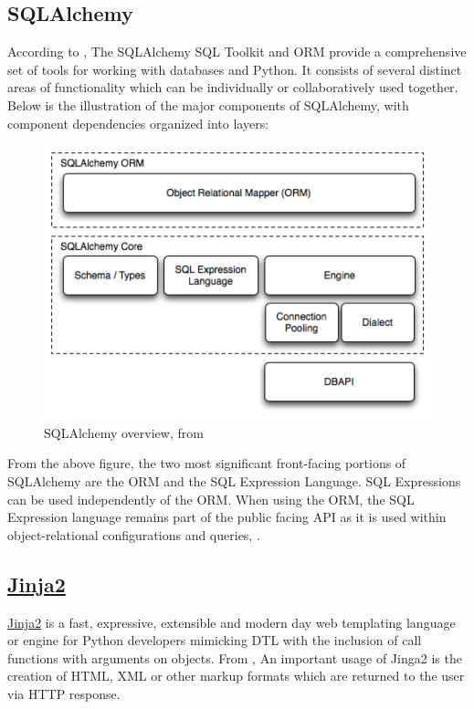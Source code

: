 \subsection{SQLAlchemy}
According to \citet{Bayer:2016}, The SQLAlchemy \ac{SQL} Toolkit and \ac{ORM} provide a comprehensive set of tools for working with databases and Python. It consists of several distinct areas of functionality which can be individually or collaboratively used together. Below is the illustration of the major components of SQLAlchemy, with component dependencies organized into layers:
\begin{figure}[htbp]
	\centering
	\includegraphics[width=1\textwidth]{./sqlalchemy.png}
	\caption{SQLAlchemy overview, from \citet{Bayer:2016}}
\end{figure}


From the above figure, the two most significant front-facing portions of SQLAlchemy are the \ac{ORM} and the \ac{SQL} Expression Language. SQL Expressions can be used independently of the \ac{ORM}. When using the \ac{ORM}, the \ac{SQL} Expression language remains part of the public facing \ac{API} as it is used within object-relational configurations and queries, \citet{Bayer:2016}.
\subsection{\href{http://jinja.pocoo.org/}{Jinja2}}
\href{http://jinja.pocoo.org/}{Jinja2} is a fast, expressive, extensible and modern day web templating language or engine for Python developers mimicking \ac{DTL} with the inclusion of call functions with arguments on objects. From \citet{Ronacher:2017}, An important usage of Jinga2 is the creation of \ac{HTML}, \ac{XML} or other markup formats which are returned to the user via \ac{HTTP} response.
